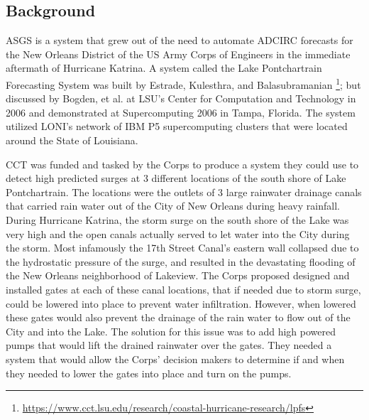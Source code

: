 \documentclass{article}
\begin{document}
\subsection{Background}

ASGS is a system that grew out of the need to automate ADCIRC forecasts for the
New Orleans District of the US Army Corps of Engineers in the immediate
aftermath of Hurricane Katrina. A system called the Lake Pontchartrain
Forecasting System was built by Estrade, Kulesthra, and Balasubramanian
\footnote{\url{https://www.cct.lsu.edu/research/coastal-hurricane-research/lpfs}};
 but discussed by Bogden, et al. \cite{LPFS} at LSU's Center for
Computation and Technology in 2006 and demonstrated at Supercomputing 2006 in
Tampa, Florida. The system utilized LONI's network of IBM P5 supercomputing
clusters that were located around the State of Louisiana.

CCT was funded and tasked by the Corps to produce a system they could use to
detect high predicted surges at 3 different locations of the south shore of Lake
Pontchartrain. The locations were the outlets of 3 large rainwater drainage
canals that carried rain water out of the City of New Orleans during heavy
rainfall. During Hurricane Katrina, the storm surge on the south shore of the
Lake was very high and the open canals actually served to let water into the
City during the storm. Most infamously the 17th Street Canal's eastern wall
collapsed due to the hydrostatic pressure of the surge, and resulted in the
devastating flooding of the New Orleans neighborhood of Lakeview.  The Corps
proposed designed and installed gates at each of these canal locations, that if
needed due to storm surge, could be lowered into place to prevent water
infiltration. However, when lowered these gates would also prevent the drainage
of the rain water to flow out of the City and into the Lake. The solution for
this issue was to add high powered pumps that would lift the drained rainwater
over the gates. They needed a system that would allow the Corps' decision makers
to determine if and when they needed to lower the gates into place and turn on
the pumps.
\end{document}
